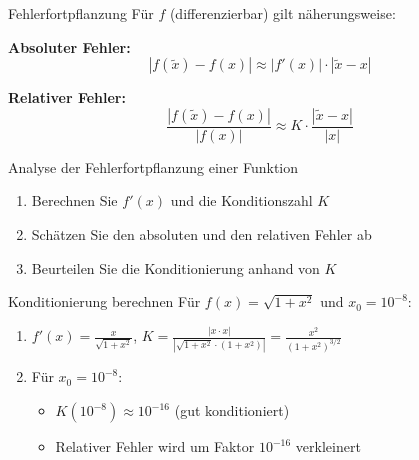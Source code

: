 \begin{theorem}{Fehlerfortpflanzung}
Für $f$ (differenzierbar) gilt näherungsweise:
\vspace{1mm}\\
\begin{minipage}[t]{0.47\textwidth}
    \textbf{Absoluter Fehler:}  
    \vspace{-2mm}\\
    $$|f(\tilde{x})-f(x)| \approx |f'(x)| \cdot |\tilde{x}-x|$$
\end{minipage}
\hspace{3mm}
\begin{minipage}[t]{0.43\textwidth}
    \textbf{Relativer Fehler:}  
    \vspace{-2mm}\\
    $$\frac{|f(\tilde{x})-f(x)|}{|f(x)|} \approx K \cdot \frac{|\tilde{x}-x|}{|x|}$$
\end{minipage}
\end{theorem}

\begin{KR}{Analyse der Fehlerfortpflanzung einer Funktion}
\begin{enumerate}
    \item Berechnen Sie $f'(x)$ und die Konditionszahl $K$
    \item Schätzen Sie den absoluten und den relativen Fehler ab
    \item Beurteilen Sie die Konditionierung anhand von $K$
\end{enumerate}
\end{KR}

\begin{example2}{Konditionierung berechnen}
Für $f(x) = \sqrt{1+x^2}$ und $x_0 = 10^{-8}$:
\begin{enumerate}
    \item $f'(x) = \frac{x}{\sqrt{1+x^2}}$, $K = \frac{|x \cdot x|}{|\sqrt{1+x^2} \cdot (1+x^2)|} = \frac{x^2}{(1+x^2)^{3/2}}$
    \item Für $x_0 = 10^{-8}$:
    \begin{itemize}
        \item $K(10^{-8}) \approx 10^{-16}$ (gut konditioniert)
        \item Relativer Fehler wird um Faktor $10^{-16}$ verkleinert
    \end{itemize}
\end{enumerate}
\end{example2}

\raggedcolumns


